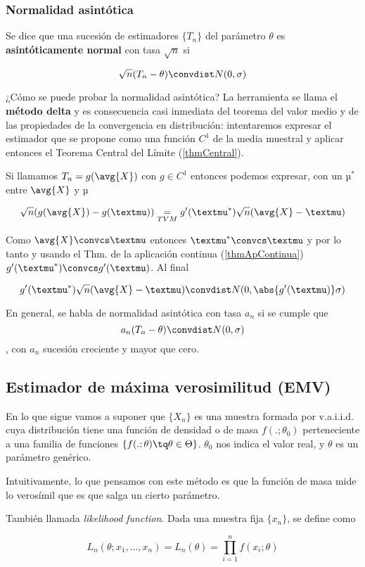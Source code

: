 \documentclass{apuntes}
\begin{document}
\subsubsection{Normalidad asintótica} Se dice que una sucesión de estimadores $\{T_n\}$ del parámetro $\theta$ es \textbf{asintóticamente normal} con tasa $\sqrt{n}$ si

\[ \sqrt{n} (T_n - \theta) \convdist N(0,\sigma) \]

¿Cómo se puede probar la normalidad asintótica? La herramienta se llama el \textbf{método delta}\label{defMetDelta}  y es consecuencia casi inmediata del teorema del valor medio y de las propiedades de la convergencia en distribución: intentaremos expresar el estimador que se propone como una función $C^1$ de la media muestral y aplicar entonces el Teorema Central del Límite (\ref{thmCentral}).

Si llamamos $T_n = g(\avg{X})$ con $g\in C^1$ entonces podemos expresar, con un $µ^\ast$ entre $\avg{X}$ y $µ$

\[ \sqrt{n} (g(\avg{X}) - g(µ)) \underset{TVM}{=} g'(µ^\ast) \sqrt{n}(\avg{X} -µ) \]

Como $\avg{X}\convcs µ$ entonces $µ^\ast \convcs µ$ y por lo tanto y usando el Thm. de la aplicación continua (\ref{thmApContinua}) $g'(µ^\ast)\convcs g'(µ)$. Al final 

\[ g'(µ^\ast) \sqrt{n}(\avg{X} -µ) \convdist N(0, \abs{g'(µ)}\sigma) \]

En general, se habla de normalidad asintótica con tasa $a_n$ si se cumple que \[ a_n (T_n - \theta) \convdist N(0,\sigma) \], con $a_n$ sucesión creciente y mayor que cero.

\subsection{Estimador de máxima verosimilitud (EMV)}

En lo que sigue vamos a suponer que $\{X_n\}$ es una muestra formada por v.a.i.i.d. cuya distribución tiene una función de densidad o de masa $f(.;\theta_0)$ perteneciente a una familia de funciones $\{f(.;\theta) \tq \theta \in \Theta\}$. $\theta_0$ nos indica el valor real, y $\theta$ es un parámetro genérico.

Intuitivamente, lo que pensamos con este método es que la función de masa mide lo verosímil que es que salga un cierto parámetro. 

\begin{defn} También llamada \textit{likelihood function}. Dada una muestra fija $\{x_n\}$, se define como

\[ L_n(\theta;x_1,\dotsc,x_n) = L_n(\theta) = \prod_{i=1}^n f(x_i;\theta) \]
\end{defn}
\end{document}
